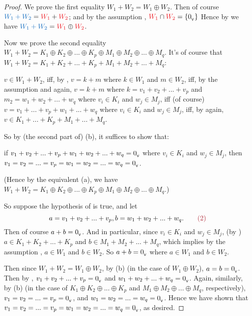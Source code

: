 \begin{note}
\end{note}

\begin{proof}
We prove the first equality \(W_1 + W_2 = W_1 \oplus W_2\).
Then of course \(\BLUE{W_1 + W_2} = \RED{W_1} + \RED{W_2}\);
and by the assumption , \(\RED{W_1} \cap \RED{W_2} = \{ \OV \}\)
Hence by  we have \(\BLUE{W_1 + W_2} = \RED{W_1} \oplus \RED{W_2}\).

Now we prove the second equality \(W_1 + W_2 = K_1 \oplus K_2 \oplus ... \oplus K_p \oplus M_1 \oplus M_2 \oplus ... \oplus M_q\).
It's of course that \(W_1 + W_2 = K_1 + K_2 + ... + K_p + M_1 + M_2 + ... + M_q\):

\(v \in W_1 + W_2\),
iff, by , \(v = k + m\) where \(k \in W_1\) and \(m \in W_2\),
iff, by the assumption  and  again, \(v = k + m\) where \(k = v_1 + v_2 + ... + v_p\) and \(m_2 = w_1 + w_2 + ... + w_q\) where \(v_i \in K_i\) and \(w_j \in M_j\),
iff (of course) \(v = v_1 + ... + v_p + w_1 + ... + w_q\) where \(v_i \in K_i\) and \(w_j \in M_j\),
iff, by  again, \(v \in K_1 + ... + K_p + M_1 + ... + M_q\).

So by (the second part of) (b), it suffices to show that:
\begin{center}
    if \(v_1 + v_2 + ... + v_p + w_1 + w_2 + ... + w_q = 0_{_{\textsf{V}}}\) where \(v_i \in K_i\) and \(w_j \in M_j\), then \(v_1 = v_2 = ... = v_p = w_1 = w_2 = ... = w_q = 0_{_{\textsf{V}}}\). \quad \quad {}
\end{center}
(Hence by the equivalent (a), we have \(W_1 + W_2 = K_1 \oplus K_2 \oplus ... \oplus K_p \oplus M_1 \oplus M_2 \oplus ... \oplus M_q\).)

So suppose the hypothesis of  is true, and let
\[
    a = v_1 + v_2 + ... + v_p, b = w_1 + w_2 + ... + w_q. \quad \quad \MAROON{(2)}
\]
Then of course \(a + b = 0_{_{\textsf{V}}}\).
And in particular, since \(v_i \in K_i\) and \(w_j \in M_j\), (by ) \(a \in K_1 + K_2 + ... + K_p\) and \(b \in M_1 + M_2 + ... + M_q\),
which implies by the assumption , \(a \in W_1\) and \(b \in W_2\).
So \(a + b = 0_{_{\textsf{V}}}\) where \(a \in W_1\) and \(b \in W_2\).

Then since \(W_1 + W_2 = W_1 \oplus W_2\), by (b) (in the case of \(W_1 \oplus W_2\)), \(a = b = 0_{_{\textsf{V}}}\).
Then by , \(v_1 + v_2 + ... + v_p = 0_{_{\textsf{V}}}\) and \(w_1 + w_2 + ... + w_q = 0_{_{\textsf{V}}}\).
Again, similarly, by (b) (in the case of \(K_1 \oplus K_2 \oplus ... \oplus K_p\) and \(M_1 \oplus M_2 \oplus ... \oplus M_q\), respectively), \(v_1 = v_2 = ... = v_p = 0_{_{\textsf{V}}}\), and \(w_1 = w_2 = ... = w_q = 0_{_{\textsf{V}}}\).
Hence we have shown that \(v_1 = v_2 = ... = v_p = w_1 = w_2 = ... = w_q = 0_{_{\textsf{V}}}\), as desired.
\end{proof}
